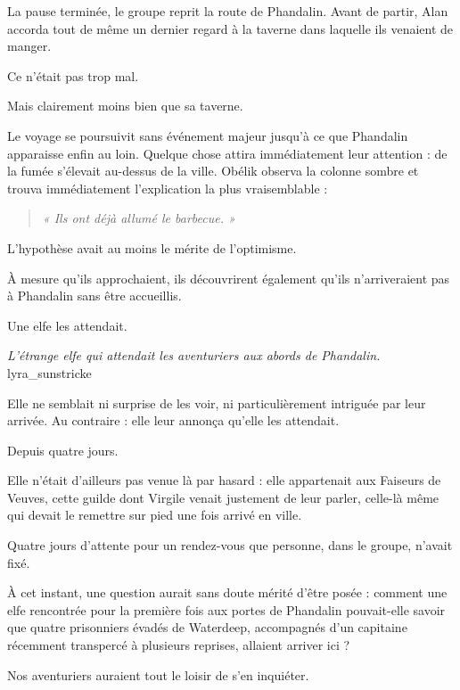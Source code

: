 \scenebreak

La pause terminée, le groupe reprit la route de Phandalin. Avant de partir, Alan accorda tout de même un dernier regard à la taverne dans laquelle ils venaient de manger.

Ce n'était pas trop mal.

Mais clairement moins bien que sa taverne.

Le voyage se poursuivit sans événement majeur jusqu'à ce que Phandalin apparaisse enfin au loin. Quelque chose attira immédiatement leur attention : de la fumée s'élevait au-dessus de la ville. Obélik observa la colonne sombre et trouva immédiatement l'explication la plus vraisemblable :

\begin{quote}
    \itshape
    « Ils ont déjà allumé le barbecue. »
\end{quote}

L'hypothèse avait au moins le mérite de l'optimisme.

À mesure qu'ils approchaient, ils découvrirent également qu'ils n'arriveraient pas à Phandalin sans être accueillis.

Une elfe les attendait.

{\textit{L'étrange elfe qui attendait les aventuriers aux abords de Phandalin.}}
{lyra_sunstricke}

Elle ne semblait ni surprise de les voir, ni particulièrement intriguée par leur arrivée. Au contraire : elle leur annonça qu'elle les attendait.

Depuis quatre jours.

Elle n'était d'ailleurs pas venue là par hasard : elle appartenait aux Faiseurs de Veuves, cette guilde dont Virgile venait justement de leur parler, celle-là même qui devait le remettre sur pied une fois arrivé en ville.

\begin{narrateur}
Quatre jours d'attente pour un rendez-vous que personne, dans le groupe, n'avait fixé.

À cet instant, une question aurait sans doute mérité d'être posée : comment une elfe rencontrée pour la première fois aux portes de Phandalin pouvait-elle savoir que quatre prisonniers évadés de Waterdeep, accompagnés d'un capitaine récemment transpercé à plusieurs reprises, allaient arriver ici ?

Nos aventuriers auraient tout le loisir de s'en inquiéter.
\end{narrateur}

